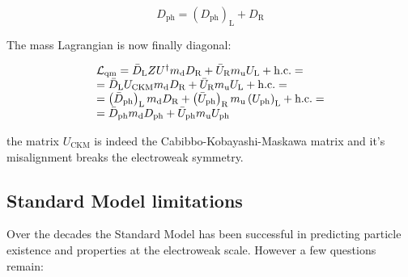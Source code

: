 \begin{equation}
D_{\text{ph}} = \left(D_{\text{ph}}\right)_{\text{L}} + D_{\text{R}}
\end{equation}

The mass Lagrangian is now finally diagonal:

\begin{equation}
\begin{array}{l c l}
\mathcal{L}_{\text{qm}} = \bar{D}_{\text{L}}ZU^{\dagger}m_{\text{d}}D_{\text{R}} + \bar{U}_{\text{R}}m_{\text{u}}U_{\text{L}} + \text{h.c.} = \\
= \bar{D}_{\text{L}}U_{\text{CKM}}m_{\text{d}}D_{\text{R}} + \bar{U}_{\text{R}}m_{\text{u}}U_{\text{L}} + \text{h.c.} = \\
=  \left(\bar{D}_{\text{ph}}\right)_{\text{L}}m_{\text{d}}D_{\text{R}} + \left(\bar{U}_{\text{ph}}\right)_{\text{R}}m_{\text{u}}\left(U_{\text{ph}}\right)_{\text{L}} + \text{h.c.} = \\
= \bar{D}_{\text{ph}}m_{\text{d}}D_{\text{ph}} + \bar{U}_{\text{ph}}m_{\text{u}}U_{\text{ph}}
\label{eq::Lqm_Uckm_diagonal}
\end{array}
\end{equation}

the matrix $U_{\text{CKM}}$ is indeed the Cabibbo-Kobayashi-Maskawa matrix and it's misalignment breaks the electroweak symmetry.

\subsection{Standard Model limitations}

Over the decades the Standard Model has been successful in predicting particle existence and properties at the electroweak scale. However a few questions remain:


